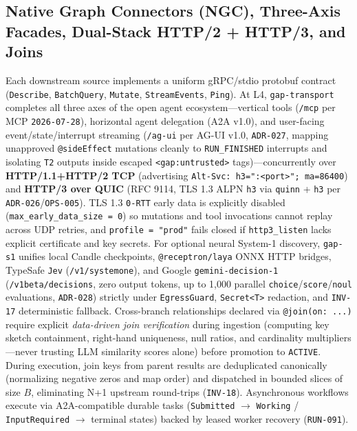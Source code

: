 \documentclass[10pt,twocolumn]{article}
\begin{document}
\subsection{Native Graph Connectors (NGC), Three-Axis Facades, Dual-Stack HTTP/2 + HTTP/3, and Joins}
Each downstream source implements a uniform gRPC/stdio protobuf contract (\texttt{Describe}, \texttt{BatchQuery}, \texttt{Mutate}, \texttt{StreamEvents}, \texttt{Ping}). At L4, \texttt{gap-transport} completes all three axes of the open agent ecosystem—vertical tools (\texttt{/mcp} per MCP \texttt{2026-07-28}), horizontal agent delegation (A2A v1.0), and user-facing event/state/interrupt streaming (\texttt{/ag-ui} per AG-UI v1.0, \texttt{ADR-027}, mapping unapproved \texttt{@sideEffect} mutations cleanly to \texttt{RUN\_FINISHED} interrupts and isolating \texttt{T2} outputs inside escaped \texttt{<gap:untrusted>} tags)—concurrently over \textbf{HTTP/1.1+HTTP/2 TCP} (advertising \texttt{Alt-Svc: h3=":<port>"; ma=86400}) and \textbf{HTTP/3 over QUIC} (RFC 9114, TLS 1.3 ALPN \texttt{h3} via \texttt{quinn} + \texttt{h3} per \texttt{ADR-026}/\texttt{OPS-005}). TLS 1.3 \texttt{0-RTT} early data is explicitly disabled (\texttt{max\_early\_data\_size = 0}) so mutations and tool invocations cannot replay across UDP retries, and \texttt{profile = "prod"} fails closed if \texttt{http3\_listen} lacks explicit certificate and key secrets. For optional neural System-1 discovery, \texttt{gap-s1} unifies local Candle checkpoints, \texttt{@receptron/laya} ONNX HTTP bridges, TypeSafe \texttt{Jev} (\texttt{/v1/systemone}), and Google \texttt{gemini-decision-1} (\texttt{/v1beta/decisions}, zero output tokens, up to 1,000 parallel \texttt{choice}/\texttt{score}/\texttt{noul} evaluations, \texttt{ADR-028}) strictly under \texttt{EgressGuard}, \texttt{Secret<T>} redaction, and \texttt{INV-17} deterministic fallback. Cross-branch relationships declared via \texttt{@join(on: ...)} require explicit \emph{data-driven join verification} during ingestion (computing key sketch containment, right-hand uniqueness, null ratios, and cardinality multipliers—never trusting LLM similarity scores alone) before promotion to \texttt{ACTIVE}. During execution, join keys from parent results are deduplicated canonically (normalizing negative zeros and map order) and dispatched in bounded slices of size $B$, eliminating N+1 upstream round-trips (\texttt{INV-18}). Asynchronous workflows execute via A2A-compatible durable tasks (\texttt{Submitted} $\rightarrow$ \texttt{Working} / \texttt{InputRequired} $\rightarrow$ terminal states) backed by leased worker recovery (\texttt{RUN-091}).
\end{document}
